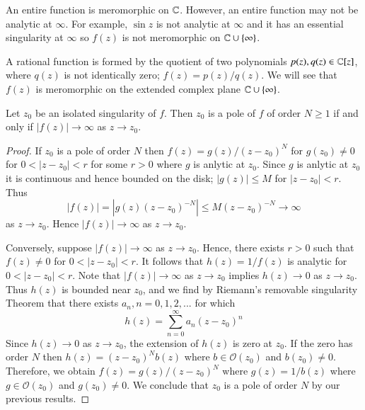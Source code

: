\begin{example}
    An entire function is meromorphic on $\mathbb C$. However, an entire function may not be analytic at $\infty$. For example, $\sin z$ is not analytic at $\infty$ and it has an essential singularity at $\infty$ so $f(z)$ is not meromorphic on $\mathbb C\cup \{\infty\}$.
\end{example}


\begin{example}
    A rational function is formed by the quotient of two polynomials $p(z),q(z) \in \mathbb C[z]$, where $q(z)$ is not identically zero; $f(z) = p(z)/q(z)$. We will see that $f(z)$ is meromorphic on the extended complex plane $\mathbb C\cup\{\infty\}$.
\end{example}

\begin{theorem}
    Let $z_0$ be an isolated singularity of $f$. Then $z_0$ is a pole of $f$ of order $N \geq 1$ if and only if $|f(z)| \rightarrow \infty$ as $z\rightarrow z_0$.
\end{theorem}
\begin{proof}
    If $z_0$ is a pole of order $N$ then $f(z) = g(z)/(z-z_0)^N$ for $g(z_0)\neq 0$ for $0 < |z-z_0| < r$ for some $r > 0$ where $g$ is anlytic at $z_0$. Since $g$ is anlytic at $z_0$ it is continuous and hence bounded on the disk; $|g(z)| \leq M$ for $|z-z_0| < r$. Thus \begin{equation*}
        |f(z)| = |g(z)(z-z_0)^{-N}| \leq M(z-z_0)^{-N}\rightarrow \infty
    \end{equation*}
    as $z\rightarrow z_0$. Hence $|f(z)| \rightarrow \infty$ as $z\rightarrow z_0$.

    Conversely, suppose $|f(z)|\rightarrow \infty$ as $z\rightarrow z_0$. Hence, there exists $r > 0$ such that $f(z) \neq 0$ for $0 < |z-z_0| < r$. It follows that $h(z) = 1/f(z)$ is analytic for $0 < |z-z_0| < r$. Note that $|f(z)|\rightarrow \infty$ as $z\rightarrow z_0$ implies $h(z) \rightarrow 0$ as $z\rightarrow z_0$. Thus $h(z)$ is bounded near $z_0$, and we find by Riemann's removable singularity Theorem that there exists $a_n, n = 0,1,2,...$ for which \begin{equation*}
        h(z) = \sum_{n=0}^{\infty}a_n(z-z_0)^n
    \end{equation*}
    Since $h(z)\rightarrow 0$ as $z\rightarrow z_0$, the extension of $h(z)$ is zero at $z_0$. If the zero has order $N$ then $h(z) = (z-z_0)^Nb(z)$ where $b \in \mathcal{O}(z_0)$ and $b(z_0) \neq 0$. Therefore, we obtain $f(z) = g(z)/(z-z_0)^N$ where $g(z) = 1/b(z)$ where $g \in \mathcal{O}(z_0)$ and $g(z_0) \neq 0$. We conclude that $z_0$ is a pole of order $N$ by our previous results.
\end{proof}

